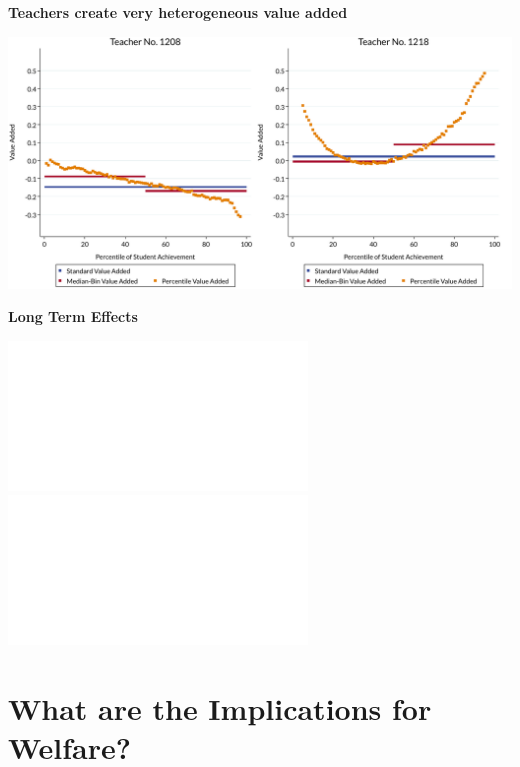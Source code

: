 \documentclass[t,aspectratio=169,11pt,presentation]{beamer}
\begin{document}
\begin{frame}[label=het1,c]{\textbf{Teachers create very heterogeneous value added}}



\begin{center}
\includegraphics[width=.85\textwidth]{slides/slides_pffls/fig1_heterogeneity.pdf}
\end{center}

\hyperlink{example}{}
\end{frame}
\begin{frame}[c]{\textbf{Long Term Effects}}
\begin{center}



\includegraphics<1-2>[width=.85\textwidth]{slides/slides_pffls/fig2a_longterm.pdf}%
\includegraphics<3>[width=.85\textwidth]{slides/slides_pffls/fig2b_longterm.pdf}
\end{center}

\end{frame}



\section{What are the Implications for Welfare?}


\end{document}
